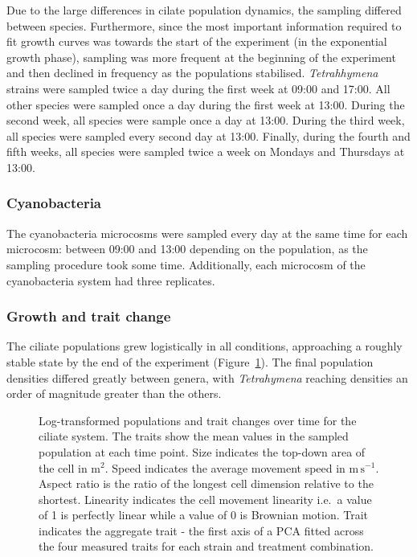 \documentclass[
  letterpaper,
  DIV=11,
  numbers=noendperiod]{scrartcl}
\begin{document}
Due to the large differences in cilate population dynamics, the sampling
differed between species. Furthermore, since the most important
information required to fit growth curves was towards the start of the
experiment (in the exponential growth phase), sampling was more frequent
at the beginning of the experiment and then declined in frequency as the
populations stabilised. \emph{Tetrahhymena} strains were sampled twice a
day during the first week at 09:00 and 17:00. All other species were
sampled once a day during the first week at 13:00. During the second
week, all species were sample once a day at 13:00. During the third
week, all species were sampled every second day at 13:00. Finally,
during the fourth and fifth weeks, all species were sampled twice a week
on Mondays and Thursdays at 13:00.

\subsubsection{Cyanobacteria}\label{cyanobacteria}

The cyanobacteria microcosms were sampled every day at the same time for
each microcosm: between 09:00 and 13:00 depending on the population, as
the sampling procedure took some time. Additionally, each microcosm of
the cyanobacteria system had three replicates.

\subsubsection{Growth and trait change}\label{growth-and-trait-change}

The ciliate populations grew logistically in all conditions, approaching
a roughly stable state by the end of the experiment
(Figure~\ref{fig-cilia-pop-traits-time}). The final population densities
differed greatly between genera, with \emph{Tetrahymena} reaching
densities an order of magnitude greater than the others.

\begin{figure}


\caption{\label{fig-cilia-pop-traits-time}Log-transformed populations
and trait changes over time for the ciliate system. The traits show the
mean values in the sampled population at each time point. Size indicates
the top-down area of the cell in \textmu\(\mathrm{m}^{2}\). Speed
indicates the average movement speed in \textmu\(\mathrm{m \, s}^{-1}\).
Aspect ratio is the ratio of the longest cell dimension relative to the
shortest. Linearity indicates the cell movement linearity i.e.~a value
of 1 is perfectly linear while a value of 0 is Brownian motion. Trait
indicates the aggregate trait - the first axis of a PCA fitted across
the four measured traits for each strain and treatment combination.}

\end{figure}%
\end{document}

